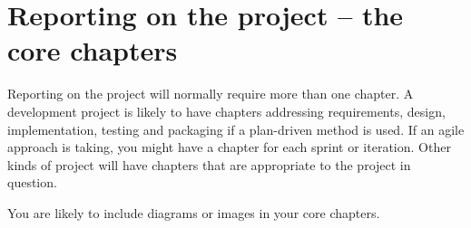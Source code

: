 \chapter{Reporting on the project -- the core chapters}

Reporting on the project will normally require more than one chapter.
A development project is likely to have chapters addressing requirements, design, implementation, testing and packaging if a plan-driven method is used.  If an agile approach is taking, you might have a chapter for each sprint or iteration.
Other kinds of project will have chapters that are appropriate to the project in question.

You are likely to include diagrams or images in your core chapters.